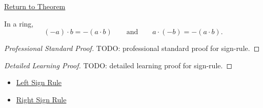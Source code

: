 \newpage
{}
\label{prf:sign-rule}

\begin{remark*}[Return]
\hyperref[prop:sign-rule]{Return to Theorem}
\end{remark*}

\begin{proposition*}
In a ring,
\[
(-a)\cdot b=-(a\cdot b)
\qquad\text{and}\qquad
a\cdot(-b)=-(a\cdot b).
\]
\end{proposition*}

\begin{proof}[Professional Standard Proof]
\LRAProofBodyStart
TODO: professional standard proof for sign-rule.
\end{proof}

\begin{proof}[Detailed Learning Proof]
\LRAProofBodyStart
TODO: detailed learning proof for sign-rule.
\end{proof}

\begin{remark*}
\end{remark*}

\begin{dependencies}
\begin{itemize}
  \item \hyperref[prop:left-sign-rule]{Left Sign Rule}
  \item \hyperref[prop:right-sign-rule]{Right Sign Rule}
\end{itemize}
\end{dependencies}

\clearpage
